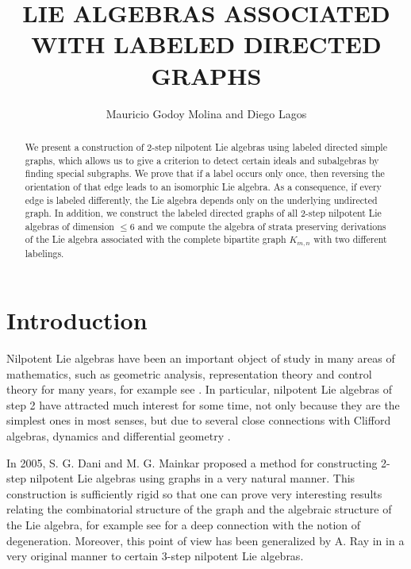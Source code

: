 \documentclass[12pt]{amsart}
\title[LIE ALGEBRAS ASSOCIATED WITH LABELED DIRECTED GRAPHS]{LIE ALGEBRAS ASSOCIATED WITH LABELED DIRECTED GRAPHS}
\author{Mauricio Godoy Molina and Diego Lagos}
\begin{document}
\maketitle

\begin{abstract}
We present a construction of 2-step nilpotent Lie algebras using labeled directed simple graphs, which allows us to give a criterion to detect certain ideals and subalgebras by finding special subgraphs. We prove that if a label occurs only once, then reversing the orientation of that edge leads to an isomorphic Lie algebra. As a consequence, if every edge is labeled differently, the Lie algebra depends only on the underlying undirected graph. In addition, we construct the labeled directed graphs of all 2-step nilpotent Lie algebras of dimension $\leq6$ and we compute the algebra of strata preserving derivations of the Lie algebra associated with the complete bipartite graph $K_{m,n}$ with two different labelings.
\end{abstract}

\section{Introduction}

Nilpotent Lie algebras have been an important object of study in many areas of mathematics, such as geometric analysis, representation theory and control theory for many years, for example see \cite{abb,bon, cap, j,klr, m}. In particular, nilpotent Lie algebras of step 2 have attracted much interest for some time, not only because they are the simplest ones in most senses, but due to several close connections with Clifford algebras, dynamics and differential geometry \cite{eberlein1, eberlein2,fu,markina, kaplan1,kaplan2}. 

In 2005, S. G. Dani and M. G. Mainkar \cite{mainkar1} proposed a method for constructing 2-step nilpotent Lie algebras using graphs in a very natural manner. This construction is sufficiently rigid so that one can prove very interesting results relating the combinatorial structure of the graph and the algebraic structure of the Lie algebra, for example see  \cite{aaa} for a deep connection with the notion of degeneration. Moreover, this point of view has been generalized by A. Ray in \cite{ray} in a very original manner to certain 3-step nilpotent Lie algebras. 
\end{document}
